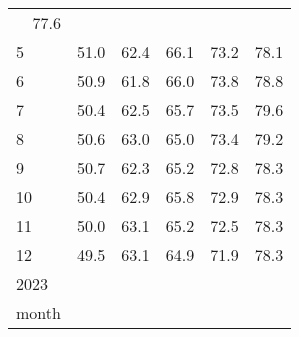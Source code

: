 \begin{tabular}{llllll}
  \multicolumn{1}{r}{77.6} \\
\multicolumn{1}{l}{\hspace{3em}5} &
  \multicolumn{1}{|r}{51.0} &
  \multicolumn{1}{r}{62.4} &
  \multicolumn{1}{r}{66.1} &
  \multicolumn{1}{r}{73.2} &
  \multicolumn{1}{r}{78.1} \\
\multicolumn{1}{l}{\hspace{3em}6} &
  \multicolumn{1}{|r}{50.9} &
  \multicolumn{1}{r}{61.8} &
  \multicolumn{1}{r}{66.0} &
  \multicolumn{1}{r}{73.8} &
  \multicolumn{1}{r}{78.8} \\
\multicolumn{1}{l}{\hspace{3em}7} &
  \multicolumn{1}{|r}{50.4} &
  \multicolumn{1}{r}{62.5} &
  \multicolumn{1}{r}{65.7} &
  \multicolumn{1}{r}{73.5} &
  \multicolumn{1}{r}{79.6} \\
\multicolumn{1}{l}{\hspace{3em}8} &
  \multicolumn{1}{|r}{50.6} &
  \multicolumn{1}{r}{63.0} &
  \multicolumn{1}{r}{65.0} &
  \multicolumn{1}{r}{73.4} &
  \multicolumn{1}{r}{79.2} \\
\multicolumn{1}{l}{\hspace{3em}9} &
  \multicolumn{1}{|r}{50.7} &
  \multicolumn{1}{r}{62.3} &
  \multicolumn{1}{r}{65.2} &
  \multicolumn{1}{r}{72.8} &
  \multicolumn{1}{r}{78.3} \\
\multicolumn{1}{l}{\hspace{3em}10} &
  \multicolumn{1}{|r}{50.4} &
  \multicolumn{1}{r}{62.9} &
  \multicolumn{1}{r}{65.8} &
  \multicolumn{1}{r}{72.9} &
  \multicolumn{1}{r}{78.3} \\
\multicolumn{1}{l}{\hspace{3em}11} &
  \multicolumn{1}{|r}{50.0} &
  \multicolumn{1}{r}{63.1} &
  \multicolumn{1}{r}{65.2} &
  \multicolumn{1}{r}{72.5} &
  \multicolumn{1}{r}{78.3} \\
\multicolumn{1}{l}{\hspace{3em}12} &
  \multicolumn{1}{|r}{49.5} &
  \multicolumn{1}{r}{63.1} &
  \multicolumn{1}{r}{64.9} &
  \multicolumn{1}{r}{71.9} &
  \multicolumn{1}{r}{78.3} \\
\multicolumn{1}{l}{\hspace{1em}2023} &
  \multicolumn{1}{|r}{} &
  \multicolumn{1}{r}{} &
  \multicolumn{1}{r}{} &
  \multicolumn{1}{r}{} &
  \multicolumn{1}{r}{} \\
\multicolumn{1}{l}{\hspace{2em}month} &
  \multicolumn{1}{|r}{} &
  \multicolumn{1}{r}{} &
  \multicolumn{1}{r}{} &
  \multicolumn{1}{r}{} &

\end{tabular}
